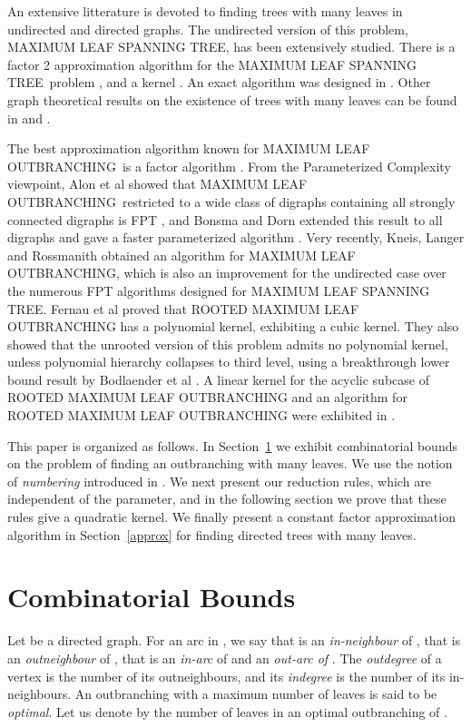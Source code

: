 \documentclass{article}
\def\RMO{R{\footnotesize{OOTED}} M{\footnotesize{AXIMUM}} L{\footnotesize{EAF}} O{\footnotesize{UTBRANCHING}} }
\def\MO{M{\footnotesize{AXIMUM}} L{\footnotesize{EAF}} O{\footnotesize{UTBRANCHING}}}
\def\ML{M{\footnotesize{AXIMUM}} L{\footnotesize{EAF}} S{\footnotesize{PANNING}} T{\footnotesize{REE}}}
\begin{document}
An extensive litterature is devoted to finding trees with many leaves in undirected and directed graphs. The undirected version of this problem, \ML, has been extensively studied. There is a factor 2 approximation algorithm for the \ML ~problem \cite{SolisMaxLeafApprox}, and a  kernel \cite{EstivillMaxLeaf}. An  exact algorithm was designed in \cite{FominKratschMaxLeaf}. Other graph theoretical results on the existence of trees with many leaves can be found in \cite{SeymourMaxLeaf} and \cite{StorerMaxLeaf}.

The best approximation algorithm known for \MO ~is a factor  algorithm \cite{DrescherMaxLeaf}. From the Parameterized Complexity viewpoint, Alon et al showed that \MO ~restricted to a wide class of digraphs containing all strongly connected digraphs is FPT \cite{AlonMaxLeaf}, and Bonsma and Dorn extended this result to all digraphs and gave a faster parameterized algorithm \cite{BonsmaMaxLeaf}. Very recently, Kneis, Langer and Rossmanith \cite{KneisMaxLeaf} obtained an  algorithm for \MO, which is also an improvement for the undirected case over the numerous FPT algorithms designed for \ML. Fernau et al \cite{FernauMaxLeaf} proved that \RMO has a polynomial kernel, exhibiting a cubic kernel. They also showed that the unrooted version of this problem admits no polynomial kernel, unless polynomial hierarchy collapses to third level, using a breakthrough lower bound result by Bodlaender et al \cite{NoKernel}. A linear kernel for the acyclic subcase of \RMO and an  algorithm for \RMO were exhibited in \cite{GutinMaxLeaf}.

\vspace{12pt}
This paper is organized as follows. In Section~\ref{sbounds} we exhibit combinatorial bounds on the problem of finding an outbranching with many leaves. We use the notion of \emph{ numbering} introduced in \cite{stnum}. We next present our reduction rules, which are independent of the parameter, and in the following section we prove that these rules give a quadratic kernel. We finally present a constant factor approximation algorithm in Section~\ref{approx} for finding directed trees with many leaves.




\section{Combinatorial Bounds}\label{sbounds}
Let  be a directed graph. For an arc  in , we say that  is an \emph{in-neighbour} of , that  is an \emph{outneighbour} of , that  is an \emph{in-arc} of  and an \emph{out-arc of }. The \emph{outdegree} of a vertex is the number of its outneighbours, and its \emph{indegree} is the number of its in-neighbours.
An outbranching with a maximum number of leaves is said to be \emph{optimal}. Let us denote by  the number of leaves in an optimal outbranching of .
\end{document}
